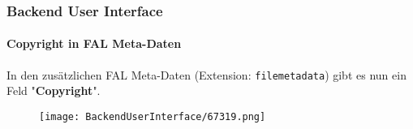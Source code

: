 \begin{frame}[fragile]
	\frametitle{Backend User Interface}
	\framesubtitle{Copyright in FAL Meta-Daten}

	In den zusätzlichen FAL Meta-Daten (Extension: \texttt{filemetadata}) gibt
	es nun ein Feld "\textbf{Copyright}".

	\begin{figure}
		\texttt{[image: BackendUserInterface/67319.png]}
	\end{figure}

\end{frame}

